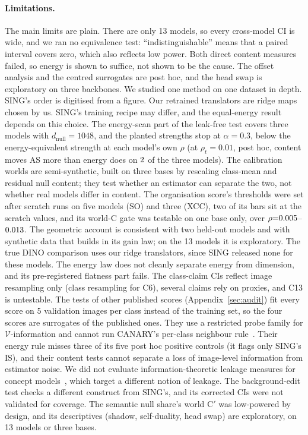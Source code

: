 \documentclass[10pt]{article}
\begin{document}
\paragraph{Limitations.}
The main limits are plain. There are only 13 models, so every cross-model CI is wide, and we ran no equivalence test: ``indistinguishable'' means that a paired interval covers zero, which also reflects low power. Both direct content measures failed, so energy is shown to suffice, not shown to be the cause. The offset analysis and the centred surrogates are post hoc, and the head swap is exploratory on three backbones. We studied one method on one dataset in depth.
SING's order is digitised from a figure.
Our retrained translators are ridge maps chosen by us.
SING's training recipe may differ, and the equal-energy result depends on this choice.
The energy-scan part of the leak-free test covers three models with $d_{\mathrm{null}}{=}1048$, and the planted strengths stop at $\alpha{=}0.3$, below the energy-equivalent strength at each model's own $\rho$ (at $\rho_t{=}0.01$, post hoc, content moves AS more than energy does on $2$ of the three models).
The calibration worlds are semi-synthetic, built on three bases by rescaling class-mean and residual null content; they test whether an estimator can separate the two, not whether real models differ in content. The organisation score's thresholds were set after scratch runs on five models (SO) and three (XCC), two of its bars sit at the scratch values, and its world-C gate was testable on one base only, over $\rho{=}0.005$--$0.013$.
The geometric account is consistent with two held-out models and with synthetic data that builds in its gain law; on the 13 models it is exploratory.
The true DINO comparison uses our ridge translators, since SING released none for these models.
The energy law does not cleanly separate energy from dimension, and its pre-registered flatness part fails.
The class-claim CIs reflect image resampling only (class resampling for C6), several claims rely on proxies, and C13 is untestable.
The tests of other published scores (Appendix~\ref{sec:audit}) fit every score on 5 validation images per class instead of the training set, so the four scores are surrogates of the published ones. They use a restricted probe family for $\mathcal{V}$-information and cannot run CANARY's per-class neighbour rule~\citep{shin2026canary}. Their energy rule misses three of its five post hoc positive controls (it flags only SING's IS), and their content tests cannot separate a loss of image-level information from estimator noise.
We did not evaluate information-theoretic leakage measures for concept models~\citep{makonnen2025}, which target a different notion of leakage.
The background-edit test checks a different construct from SING's, and its corrected CIs were not validated for coverage. The semantic null share's world C$'$ was low-powered by design, and its descriptives (shadow, self-duality, head swap) are exploratory, on 13 models or three bases.
\end{document}
